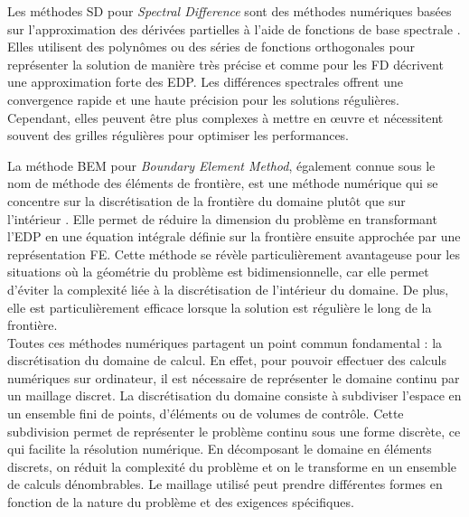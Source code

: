 Les méthodes SD pour \emph{Spectral Difference} sont des méthodes numériques basées sur l'approximation des dérivées partielles à l'aide de fonctions de base spectrale \cite{liu2006spectral, van2008stability}. Elles utilisent des polynômes ou des séries de fonctions orthogonales pour représenter la solution de manière très précise et comme pour les FD décrivent une approximation forte des EDP. Les différences spectrales offrent une convergence rapide et une haute précision pour les solutions régulières. Cependant, elles peuvent être plus complexes à mettre en œuvre et nécessitent souvent des grilles régulières pour optimiser les performances.


La méthode BEM pour \emph{Boundary Element Method}, également connue sous le nom de méthode des éléments de frontière, est une méthode numérique qui se concentre sur la discrétisation de la frontière du domaine plutôt que sur l'intérieur \cite{nedelec2001acoustic, wu2002boundary, kirkup2019boundary}. Elle permet de réduire la dimension du problème en transformant l'EDP en une équation intégrale définie sur la frontière ensuite approchée par une représentation FE. Cette méthode se révèle particulièrement avantageuse pour les situations où la géométrie du problème est bidimensionnelle, car elle permet d'éviter la complexité liée à la discrétisation de l'intérieur du domaine. De plus, elle est particulièrement efficace lorsque la solution est régulière le long de la frontière.\\

Toutes ces méthodes numériques partagent un point commun fondamental : la discrétisation du domaine de calcul. En effet, pour pouvoir effectuer des calculs numériques sur ordinateur, il est nécessaire de représenter le domaine continu par un maillage discret. La discrétisation du domaine consiste à subdiviser l'espace en un ensemble fini de points, d'éléments ou de volumes de contrôle. Cette subdivision permet de représenter le problème continu sous une forme discrète, ce qui facilite la résolution numérique. En décomposant le domaine en éléments discrets, on réduit la complexité du problème et on le transforme en un ensemble de calculs dénombrables. Le maillage utilisé peut prendre différentes formes en fonction de la nature du problème et des exigences spécifiques.


